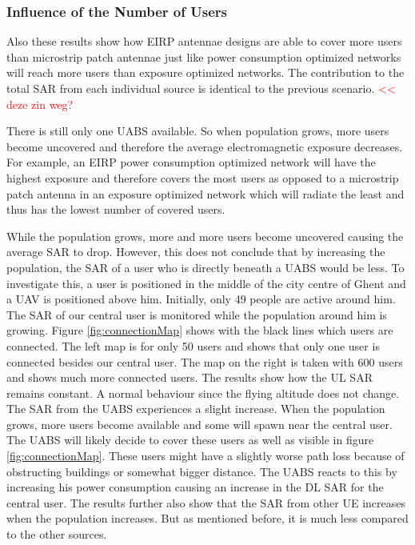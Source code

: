 \documentclass[twocolumn]{phdsymp} %
\begin{document}
\subsubsection{Influence of the Number of Users}

Also these results show how EIRP antennae designs are able to cover more users than microstrip patch antennae
just like power consumption optimized networks will reach more users than exposure optimized networks.
The contribution to the total \gls{SAR} from each individual source is identical to the previous scenario. \textcolor{red}{ << deze zin weg?}

There is still only one \gls{UABS} available. So when population grows, more users become uncovered and 
therefore the average electromagnetic exposure decreases.
For example, an EIRP power consumption optimized network
will have the highest exposure and therefore covers the most users as opposed to a microstrip patch antenna in 
an exposure optimized network which will radiate the least and thus has the lowest number of covered users.

While the population grows, more and more users become uncovered causing the average SAR to drop. 
However, this does not conclude that by increasing the population, the SAR of a user who is directly beneath a \gls{UABS} would be less.
To investigate this, a user is positioned in the middle of the city centre of Ghent and a \gls{UAV} is positioned above him. Initially, only 
49 people are active around him. The \gls{SAR} of our central user is monitored while the population around him is growing.
Figure \ref{fig:connectionMap} shows with the black lines which users are connected. The left map is for only 50 users and 
shows that only one user is connected besides our central user. The map on the right is taken with 600 users and shows much more connected users.
The results show how the \gls{UL} \gls{SAR} remains constant. A normal behaviour since the flying altitude does not change.
The \gls{SAR} from the \gls{UABS} experiences a slight increase. When the population grows, more users become available 
and some will spawn near the central user. The \gls{UABS} will likely decide to cover these users as well as visible in figure \ref{fig:connectionMap}.
These users might have a slightly 
worse path loss because of obstructing buildings or somewhat bigger distance. The \gls{UABS} reacts to this by increasing 
his power consumption causing an increase in the \gls{DL} \gls{SAR} for the central user. The results further also show 
that the \gls{SAR} from other \gls{UE} increases when the population increases. But as mentioned  before, it is much less 
compared to the other sources.
\end{document}

